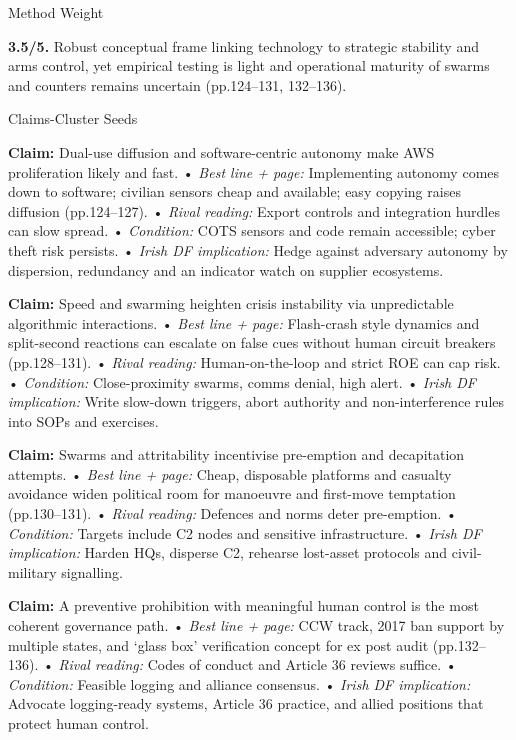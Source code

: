 Method Weight

\textbf{3.5/5.} Robust conceptual frame linking technology to strategic stability and arms control, yet empirical testing is light and operational maturity of swarms and counters remains uncertain (pp.124–131, 132–136).

Claims-Cluster Seeds

\textbf{Claim:} Dual-use diffusion and software-centric autonomy make AWS proliferation likely and fast.
• \emph{Best line + page:} Implementing autonomy comes down to software; civilian sensors cheap and available; easy copying raises diffusion (pp.124–127).
• \emph{Rival reading:} Export controls and integration hurdles can slow spread.
• \emph{Condition:} COTS sensors and code remain accessible; cyber theft risk persists.
• \emph{Irish DF implication:} Hedge against adversary autonomy by dispersion, redundancy and an indicator watch on supplier ecosystems.

\textbf{Claim:} Speed and swarming heighten crisis instability via unpredictable algorithmic interactions.
• \emph{Best line + page:} Flash-crash style dynamics and split-second reactions can escalate on false cues without human circuit breakers (pp.128–131).
• \emph{Rival reading:} Human-on-the-loop and strict ROE can cap risk.
• \emph{Condition:} Close-proximity swarms, comms denial, high alert.
• \emph{Irish DF implication:} Write slow-down triggers, abort authority and non-interference rules into SOPs and exercises.

\textbf{Claim:} Swarms and attritability incentivise pre-emption and decapitation attempts.
• \emph{Best line + page:} Cheap, disposable platforms and casualty avoidance widen political room for manoeuvre and first-move temptation (pp.130–131).
• \emph{Rival reading:} Defences and norms deter pre-emption.
• \emph{Condition:} Targets include C2 nodes and sensitive infrastructure.
• \emph{Irish DF implication:} Harden HQs, disperse C2, rehearse lost-asset protocols and civil-military signalling.

\textbf{Claim:} A preventive prohibition with meaningful human control is the most coherent governance path.
• \emph{Best line + page:} CCW track, 2017 ban support by multiple states, and ‘glass box’ verification concept for ex post audit (pp.132–136).
• \emph{Rival reading:} Codes of conduct and Article 36 reviews suffice.
• \emph{Condition:} Feasible logging and alliance consensus.
• \emph{Irish DF implication:} Advocate logging-ready systems, Article 36 practice, and allied positions that protect human control.

